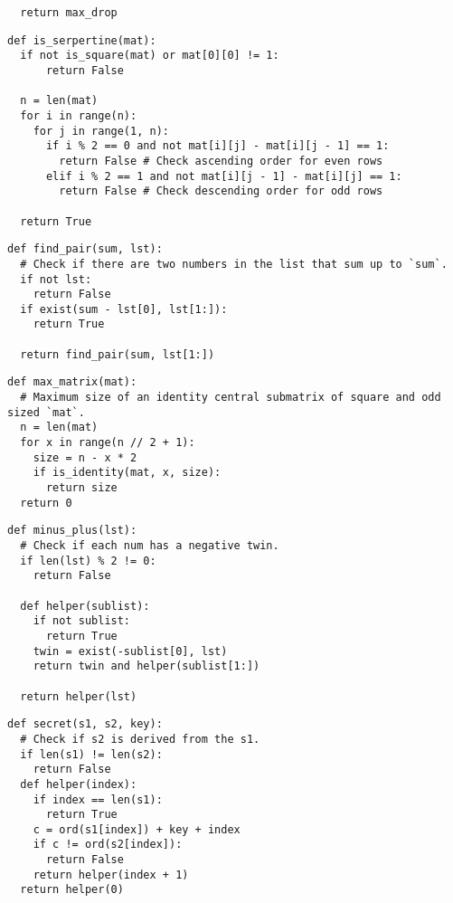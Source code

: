 \documentclass[11pt]{article}
\begin{document}
\begin{multicols}{2}
\begin{lstlisting}
  return max_drop
\end{lstlisting}

\begin{lstlisting}
def is_serpertine(mat):
  if not is_square(mat) or mat[0][0] != 1:
      return False

  n = len(mat)
  for i in range(n):
    for j in range(1, n):
      if i % 2 == 0 and not mat[i][j] - mat[i][j - 1] == 1: 
        return False # Check ascending order for even rows
      elif i % 2 == 1 and not mat[i][j - 1] - mat[i][j] == 1:  
        return False # Check descending order for odd rows

  return True
\end{lstlisting}

\vspace{0.25cm}

\begin{multicols}{2}
\begin{lstlisting}
def find_pair(sum, lst):
  # Check if there are two numbers in the list that sum up to `sum`.
  if not lst:
    return False
  if exist(sum - lst[0], lst[1:]):
    return True

  return find_pair(sum, lst[1:])
\end{lstlisting}
\begin{lstlisting}
def max_matrix(mat):
  # Maximum size of an identity central submatrix of square and odd sized `mat`.
  n = len(mat)
  for x in range(n // 2 + 1):
    size = n - x * 2
    if is_identity(mat, x, size):
      return size
  return 0
\end{lstlisting}
\end{multicols}

\vspace{-0.25cm}

\begin{multicols}{2}
\begin{lstlisting}
def minus_plus(lst):
  # Check if each num has a negative twin.
  if len(lst) % 2 != 0:
    return False

  def helper(sublist):
    if not sublist:
      return True
    twin = exist(-sublist[0], lst)
    return twin and helper(sublist[1:])

  return helper(lst)
\end{lstlisting}
\begin{lstlisting}
def secret(s1, s2, key):
  # Check if s2 is derived from the s1.
  if len(s1) != len(s2):
    return False
  def helper(index):
    if index == len(s1):
      return True
    c = ord(s1[index]) + key + index
    if c != ord(s2[index]):
      return False
    return helper(index + 1)
  return helper(0)
\end{lstlisting}
\end{multicols}


\end{multicols}
\end{document}
